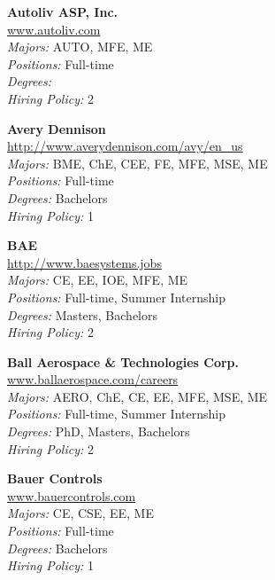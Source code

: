 \documentclass{article}
\begin{document}
\begin{center}
\begin{multicols}{3}
\begin{minipage}{.9\columnwidth}{\Large\bf Autoliv ASP, Inc. }\\
	\url{www.autoliv.com}\\
	\emph{Majors:} AUTO, MFE, ME\\
	\emph{Positions:} Full-time\\
	\emph{Degrees:} \\
	\emph{Hiring Policy:} 2\\
\end{minipage}
 
\begin{minipage}{.9\columnwidth}{\Large\bf Avery Dennison }\\
	\url{http://www.averydennison.com/avy/en_us}\\
	\emph{Majors:} BME, ChE, CEE, FE, MFE, MSE, ME\\
	\emph{Positions:} Full-time\\
	\emph{Degrees:} Bachelors\\
	\emph{Hiring Policy:} 1\\
\end{minipage}
 
\begin{minipage}{.9\columnwidth}{\Large\bf BAE }\\
	\url{http://www.baesystems.jobs}\\
	\emph{Majors:} CE, EE, IOE, MFE, ME\\
	\emph{Positions:} Full-time, Summer Internship\\
	\emph{Degrees:} Masters, Bachelors\\
	\emph{Hiring Policy:} 2\\
\end{minipage}
 
\begin{minipage}{.9\columnwidth}{\Large\bf Ball Aerospace \& Technologies Corp. }\\
	\url{www.ballaerospace.com/careers}\\
	\emph{Majors:} AERO, ChE, CE, EE, MFE, MSE, ME\\
	\emph{Positions:} Full-time, Summer Internship\\
	\emph{Degrees:} PhD, Masters, Bachelors\\
	\emph{Hiring Policy:} 2\\
\end{minipage}
 
\begin{minipage}{.9\columnwidth}{\Large\bf Bauer Controls }\\
	\url{www.bauercontrols.com}\\
	\emph{Majors:} CE, CSE, EE, ME\\
	\emph{Positions:} Full-time\\
	\emph{Degrees:} Bachelors\\
	\emph{Hiring Policy:} 1\\
\end{minipage}
 

\end{multicols}
\end{center}
\end{document}
